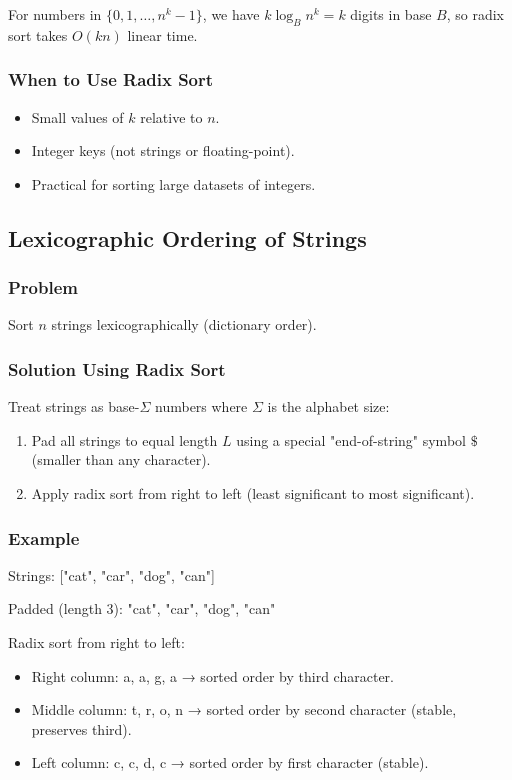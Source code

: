 \documentclass[11pt]{article}
\begin{document}
For numbers in $\{0, 1, \ldots, n^k - 1\}$, we have $k \log_B n^k = k$ digits in base $B$, so radix sort takes $O(kn)$ linear time.

\subsubsection*{When to Use Radix Sort}
\begin{itemize}
\item Small values of $k$ relative to $n$.
\item Integer keys (not strings or floating-point).
\item Practical for sorting large datasets of integers.
\end{itemize}

\subsection*{Lexicographic Ordering of Strings}

\subsubsection*{Problem}
Sort $n$ strings lexicographically (dictionary order).

\subsubsection*{Solution Using Radix Sort}
Treat strings as base-$\Sigma$ numbers where $\Sigma$ is the alphabet size:
\begin{enumerate}
\item Pad all strings to equal length $L$ using a special "end-of-string" symbol $\$$ (smaller than any character).
\item Apply radix sort from right to left (least significant to most significant).
\end{enumerate}

\subsubsection*{Example}
Strings: ["cat", "car", "dog", "can"]

Padded (length 3): "cat", "car", "dog", "can"

Radix sort from right to left:
\begin{itemize}
\item Right column: a, a, g, a → sorted order by third character.
\item Middle column: t, r, o, n → sorted order by second character (stable, preserves third).
\item Left column: c, c, d, c → sorted order by first character (stable).
\end{itemize}
\end{document}
